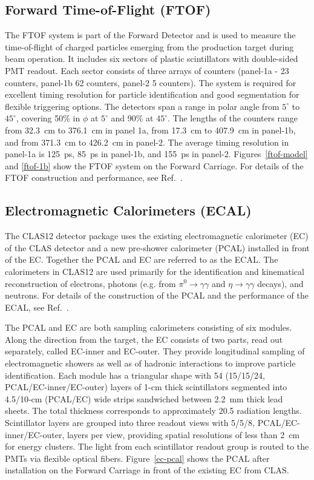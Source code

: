 \documentclass[final,3p,twocolumn]{elsarticle}
\begin{document}
\subsection{Forward Time-of-Flight (FTOF)}
\label{ftof}

The FTOF system is part of the Forward Detector and is used to measure the time-of-flight of charged particles 
emerging from the production target during beam operation. It includes six sectors of plastic scintillators with 
double-sided PMT readout. Each sector consists of three arrays of counters (panel-1a - 23 counters, panel-1b 62
counters, panel-2 5 counters). The system is required for excellent timing resolution for particle identification and
good segmentation for flexible triggering options. The detectors span a range in polar angle from $5^\circ$ to
$45^\circ$, covering 50\% in $\phi$ at $5^\circ$ and 90\% at $45^\circ$. The lengths of the counters range from
32.3~cm to 376.1~cm in panel 1a, from 17.3~cm to 407.9~cm in panel-1b, and from 371.3~cm to 426.2~cm in panel-2.
The average timing resolution in panel-1a is 125~ps, 85~ps in panel-1b, and 155~ps in panel-2.
Figures~\ref{ftof-model} and \ref{ftof-1b} show the FTOF system on the Forward Carriage. For details of the
FTOF construction and performance, see Ref.~\cite{FTOF}. 


\subsection{Electromagnetic Calorimeters (ECAL)}

The CLAS12 detector package uses the existing electromagnetic calorimeter (EC) of the CLAS detector
\cite{Amarian:2001zs} and a new pre-shower calorimeter (PCAL) installed in front of the EC. Together the
PCAL and EC are referred to as the ECAL. The calorimeters in CLAS12 are used primarily for the identification
and kinematical reconstruction of electrons, photons (e.g. from $\pi^0 \to \gamma \gamma$ and
$\eta \to \gamma  \gamma$ decays), and neutrons. For details of the construction of the PCAL and the
performance of the ECAL, see Ref.~\cite{ECAL}. 

The PCAL and EC are both sampling calorimeters consisting of six modules. Along the direction from the target,
the EC consists of two parts, read out separately, called EC-inner and EC-outer. They provide longitudinal sampling
of electromagnetic showers as well as of hadronic interactions to improve particle identification. Each module has a
triangular shape with 54 (15/15/24, PCAL/EC-inner/EC-outer) layers of 1-cm thick scintillators segmented into
4.5/10-cm (PCAL/EC) wide strips sandwiched between 2.2~mm thick lead sheets. The total thickness corresponds to
approximately 20.5 radiation lengths. Scintillator layers are grouped into three readout views with 5/5/8,
PCAL/EC-inner/EC-outer, layers per view, providing spatial resolutions of less than 2~cm for energy clusters. The
light from each scintillator readout group is routed to the PMTs via flexible optical fibers. Figure~\ref{ec-pcal}
shows the PCAL after installation on the Forward Carriage in front of the existing EC from CLAS.
\end{document}
